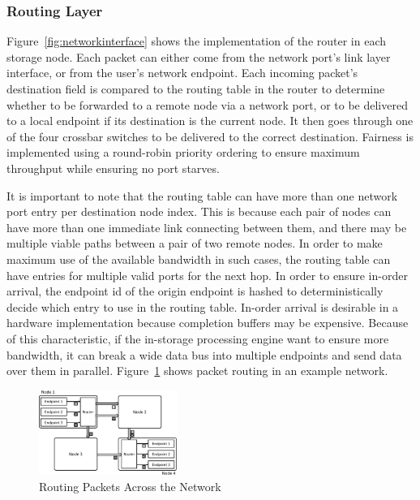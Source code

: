 \subsubsection{Routing Layer}

Figure~\ref{fig:networkinterface} shows the implementation of the router in each
storage node. Each packet can either come from the network port's link layer
interface, or from the user's network endpoint. Each incoming packet's
destination field is compared to the routing table in the router to determine
whether to be forwarded to a remote node via a network port, or to be delivered
to a local endpoint if its destination is the current node. It then goes through
one of the four crossbar switches to be delivered to the correct destination. 
Fairness is implemented using a round-robin priority ordering to ensure maximum
throughput while ensuring no port starves.

It is important to note that the routing table can have more than one network
port entry per destination node index. This is because each pair of nodes can
have more than one immediate link connecting between them, and there may be
multiple viable paths between a pair of two remote nodes. In order to make
maximum use of the available bandwidth in such cases, the routing table can have
entries for multiple valid ports for the next hop. In order to ensure in-order
arrival, the endpoint id of the origin endpoint is hashed to deterministically
decide which entry to use in the routing table. In-order arrival is desirable in
a hardware implementation because completion buffers may be expensive.
Because of this characteristic, if the in-storage processing engine want to
ensure more bandwidth, it can break a wide data bus into multiple endpoints and
send data over them in parallel. Figure~\ref{fig:networkrouting} shows packet
routing in an example network.

\begin{figure}[h]
	\begin{center}
	\includegraphics[width=0.4\textwidth]{figures/routing-crop.pdf}
	\caption{Routing Packets Across the Network}
	\label{fig:networkrouting}
	\end{center}
\end{figure}

